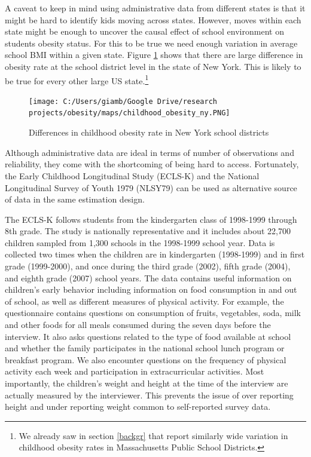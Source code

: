 \documentclass[twoside,12pt]{article}
\begin{document}
A caveat to keep in mind using administrative data from different states is that it might be hard to identify kids moving across states. However, moves within each state might be enough to uncover the causal effect of school environment on students obesity status. For this to be true we need enough variation in average school BMI within a given state. Figure \ref{fig:ny_obesity} shows that there are large difference in obesity rate at the school district level in the state of New York. This is likely to be true for every other large US state.\footnote{We already saw in section \ref{backgr} that \cite{li2015declining} report similarly wide variation in childhood obesity rates in Massachusetts Public School Districts.}  
\begin{figure}[htp]
  \centering
  \caption{Differences in childhood obesity rate in New York school districts}
  \label{fig:ny_obesity}
  \texttt{[image: C:/Users/giamb/Google Drive/research projects/obesity/maps/childhood\_obesity\_ny.PNG]}
\end{figure}

Although administrative data are ideal in terms of number of observations and reliability, they come with the shortcoming of being hard to access. Fortunately, the Early Childhood Longitudinal Study (ECLS-K) and the National Longitudinal Survey of Youth 1979 (NLSY79) can be used as alternative source of data in the same estimation design.

The ECLS-K follows students from the kindergarten class of 1998-1999 through 8th grade. The study is nationally representative and it includes about 22,700 children sampled from 1,300 schools in the 1998-1999 school year. Data is collected two times when the children are in kindergarten (1998-1999) and in first grade (1999-2000), and once during the third grade (2002), fifth grade (2004), and eighth grade (2007) school years.  The data contains useful information on children's early behavior including information on food consumption in and out of school, as well as different measures of physical activity. For example, the questionnaire contains questions on consumption of fruits, vegetables, soda, milk and other foods for all meals consumed during the seven days before the interview. It also asks questions related to the type of food available at school and whether the family participates in the national school lunch program or breakfast program. We also encounter questions on the frequency of physical activity each week and participation in extracurricular activities. Most importantly, the children's weight and height at the time of the interview are actually measured by the interviewer. This prevents the issue of over reporting height and under reporting weight common to self-reported survey data. 
\end{document}
